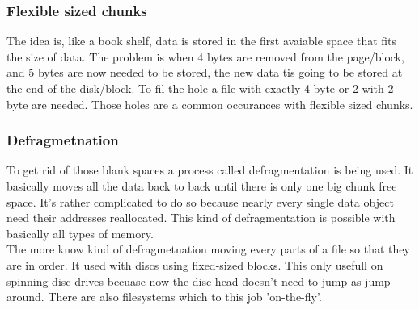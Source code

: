 \documentclass[a4paper]{scrartcl}
\begin{document}
            \subsubsection{Flexible sized chunks}
                The idea is, like a book shelf, data is stored in the first avaiable space that fits the size of data. The problem is when 4 bytes are removed from 
                the page/block, and 5 bytes are now needed to be stored, the new data tis going to be stored at the end of the disk/block. To fil the hole 
                a file with exactly 4 byte or 2 with 2 byte are needed. Those holes are a common occurances with flexible sized chunks.
            \subsubsection{Defragmetnation}
                To get rid of those blank spaces a process called defragmentation is being used. It basically moves all the data back to back until there is 
                only one big chunk free space. It's rather complicated to do so because nearly every single data object need their addresses reallocated. This kind of 
                defragmentation is possible with basically all types of memory. \\
                The more know kind of defragmetnation moving every parts of a file so that they are in order. It used with discs using fixed-sized blocks. This
                only usefull on spinning disc drives becuase now the disc head doesn't need to jump as jump around. There are also filesystems which to this job 'on-the-fly'.
\end{document}
